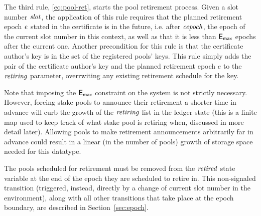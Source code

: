 The third rule, \cref{eq:pool-ret}, starts the pool retirement process. Given a
slot number $\mathit{slot}$, the application of this rule requires that the
planned retirement epoch $\mathit{e}$ stated in the certificate is in the future,
i.e. after
$\mathit{cepoch}$, the epoch of the current slot number in this context, as well as
that it is
less than $\mathsf{E_{max}}$ epochs after the current one. Another precondition for this
rule is that
the certificate author's key is in the set of the registered pools' keys.
This rule simply adds the pair of the
certificate author's key and the planned retirement epoch $e$ to the $\mathit{retiring}$
parameter, overrwiting any existing retirement schedule for the key.

Note that imposing the $\mathsf{E_{max}}$ constraint on the system is not strictly necessary.
However, forcing stake pools to announce their retirement a shorter time in
advance will curb the growth of the $\mathit{retiring}$ list in the ledger state
(this is a finite map used to keep track of what stake pool is retiring when,
discussed in more detail later).
Allowing pools to make retirement announcements arbitrarily far in advance
could result in a linear (in the number of pools) growth of storage space needed
for this datatype.

The pools scheduled for retirement must be removed from
the $\mathit{retired}$ state variable at the end of the epoch they are scheduled
to retire in. This non-signaled transition (triggered, instead, directly by a
change of current slot number in the environment), along with all other transitions
that take place at the epoch boundary, are described in Section~\ref{sec:epoch}.


